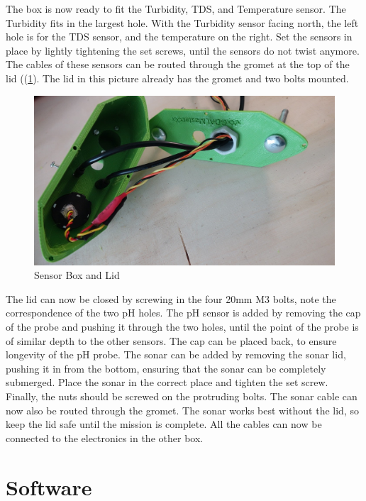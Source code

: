 \documentclass[
  english,
  man,floatsintext]{apa6}
\begin{document}
The box is now ready to fit the Turbidity, TDS, and Temperature sensor. The Turbidity fits in the largest hole. With the Turbidity sensor facing north, the left hole is for the TDS sensor, and the temperature on the right. Set the sensors in place by lightly tightening the set screws, until the sensors do not twist anymore. The cables of these sensors can be routed through the gromet at the top of the lid ((\ref{fig:sensor-box-photo2}). The lid in this picture already has the gromet and two bolts mounted.

\begin{figure}[H]
\includegraphics[width=\textwidth,]{sup/sensor_box_photo2} \caption{Sensor Box and Lid}\label{fig:sensor-box-photo2}
\end{figure}



The lid can now be closed by screwing in the four 20mm M3 bolts, note the correspondence of the two pH holes. The pH sensor is added by removing the cap of the probe and pushing it through the two holes, until the point of the probe is of similar depth to the other sensors. The cap can be placed back, to ensure longevity of the pH probe.
The sonar can be added by removing the sonar lid, pushing it in from the bottom, ensuring that the sonar can be completely submerged. Place the sonar in the correct place and tighten the set screw. Finally, the nuts should be screwed on the protruding bolts. The sonar cable can now also be routed through the gromet. The sonar works best without the lid, so keep the lid safe until the mission is complete.
All the cables can now be connected to the electronics in the other box.

\newpage

\hypertarget{software}{%
\section{Software}\label{software}}
\end{document}
